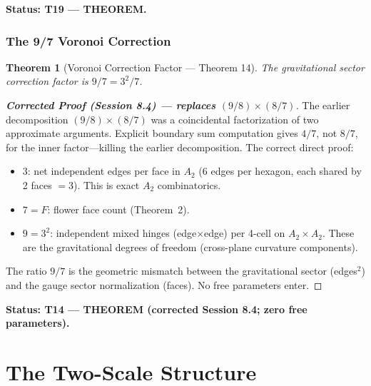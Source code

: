 \documentclass[11pt,letterpaper]{article}
\newtheorem{theorem}{Theorem}[section]
\begin{document}
\textbf{Status: T19 --- THEOREM.}

\section{The 9/7 Voronoi Correction}

\begin{theorem}[Voronoi Correction Factor --- Theorem 14]\label{thm:T14}
The gravitational sector correction factor is $9/7 = 3^2/7$.
\end{theorem}

\begin{proof}[\textbf{Corrected Proof (Session 8.4) --- replaces $(9/8)\times(8/7)$}]
The earlier decomposition $(9/8)\times(8/7)$ was a coincidental factorization
of two approximate arguments.  Explicit boundary sum computation gives $4/7$,
not $8/7$, for the inner factor---killing the earlier decomposition.
The correct direct proof:
\begin{itemize}[nosep]
  \item $3$: net independent edges per face in $A_2$ (6 edges per hexagon,
        each shared by 2 faces $= 3$).  This is exact $A_2$ combinatorics.
  \item $7 = F$: flower face count (Theorem~2).
  \item $9 = 3^2$: independent mixed hinges (edge$\times$edge) per 4-cell
        on $A_2\times A_2$.  These are the gravitational degrees of freedom
        (cross-plane curvature components).
\end{itemize}
The ratio $9/7$ is the geometric mismatch between the gravitational sector
(edges$^2$) and the gauge sector normalization (faces).  No free parameters
enter.
\end{proof}

\textbf{Status: T14 --- THEOREM (corrected Session 8.4; zero free parameters).}

%
%
\newpage
\part{The Two-Scale Structure}\label{sec:twoscale}

\end{document}
